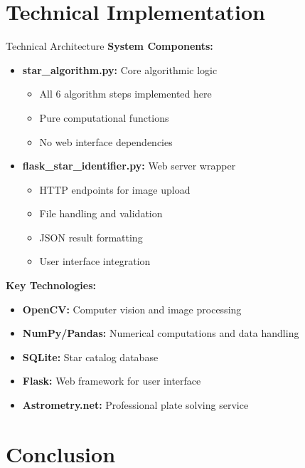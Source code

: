 \documentclass[aspectratio=169]{beamer}
\begin{document}
\section{Technical Implementation}

\begin{frame}{Technical Architecture}
\textbf{System Components:}

\begin{itemize}
\item \textbf{star\_algorithm.py:} Core algorithmic logic
\begin{itemize}
\item All 6 algorithm steps implemented here
\item Pure computational functions
\item No web interface dependencies
\end{itemize}

\item \textbf{flask\_star\_identifier.py:} Web server wrapper  
\begin{itemize}
\item HTTP endpoints for image upload
\item File handling and validation
\item JSON result formatting
\item User interface integration
\end{itemize}
\end{itemize}

\textbf{Key Technologies:}
\begin{itemize}
\item \textbf{OpenCV:} Computer vision and image processing
\item \textbf{NumPy/Pandas:} Numerical computations and data handling
\item \textbf{SQLite:} Star catalog database
\item \textbf{Flask:} Web framework for user interface
\item \textbf{Astrometry.net:} Professional plate solving service
\end{itemize}
\end{frame}

\section{Conclusion}
\end{document}
